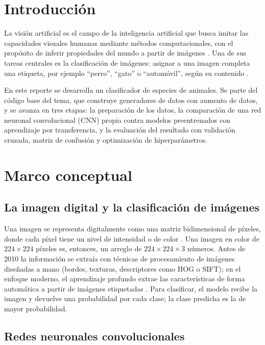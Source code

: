 \documentclass[11pt,letterpaper]{article}
\begin{document}
\portada
\indicegeneral

\section{Introducción}

La visión artificial es el campo de la inteligencia artificial que busca imitar las capacidades visuales humanas mediante métodos computacionales, con el propósito de inferir propiedades del mundo a partir de imágenes \parencite{iae_u4_t42, marr1982}. Una de sus tareas centrales es la clasificación de imágenes: asignar a una imagen completa una etiqueta, por ejemplo ``perro'', ``gato'' o ``automóvil'', según su contenido \parencite{iae_u4_t42}.

En este reporte se desarrolla un clasificador de especies de animales. Se parte del código base del tema, que construye generadores de datos con aumento de datos, y se avanza en tres etapas: la preparación de los datos, la comparación de una red neuronal convolucional (CNN) propia contra modelos preentrenados con aprendizaje por transferencia, y la evaluación del resultado con validación cruzada, matriz de confusión y optimización de hiperparámetros.

\section{Marco conceptual}

\subsection{La imagen digital y la clasificación de imágenes}

Una imagen se representa digitalmente como una matriz bidimensional de píxeles, donde cada píxel tiene un nivel de intensidad o de color \parencite{iae_u4_t42, gonzalez2018}. Una imagen en color de $224 \times 224$ píxeles es, entonces, un arreglo de $224 \times 224 \times 3$ números. Antes de 2010 la información se extraía con técnicas de procesamiento de imágenes diseñadas a mano (bordes, texturas, descriptores como HOG o SIFT); en el enfoque moderno, el aprendizaje profundo extrae las características de forma automática a partir de imágenes etiquetadas \parencite{iae_u4_t42}. Para clasificar, el modelo recibe la imagen y devuelve una probabilidad por cada clase; la clase predicha es la de mayor probabilidad.

\subsection{Redes neuronales convolucionales}
\end{document}

